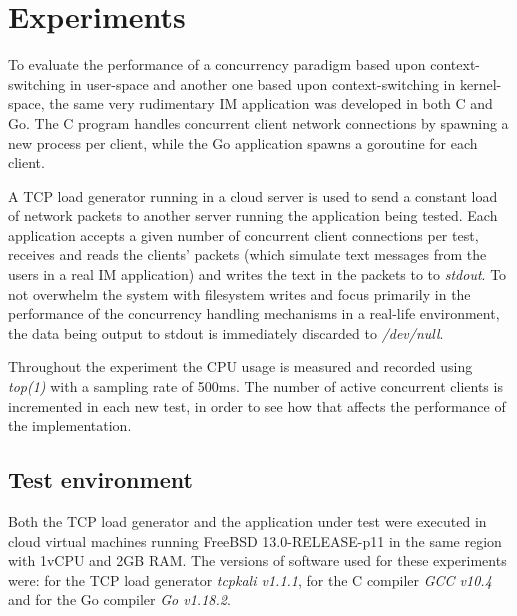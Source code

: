 \section{Experiments}
To evaluate the performance of a concurrency paradigm based upon context-switching in user-space and another one based upon context-switching in kernel-space, the same very rudimentary IM application was developed in both C and Go. The C program handles concurrent client network connections by spawning a new process per client, while the Go application spawns a goroutine for each client. 

A TCP load generator running in a cloud server is used to send a constant load of network packets to another server running the application being tested. Each application accepts a given number of concurrent client connections per test, receives and reads the clients' packets (which simulate text messages from the users in a real IM application) and writes the text in the packets to to \textit{stdout}. To not overwhelm the system with filesystem writes and focus primarily in the performance of the concurrency handling mechanisms in a real-life environment, the data being output to stdout is immediately discarded to \textit{/dev/null}. 

Throughout the experiment the CPU usage is measured and recorded using \textit{top(1)} with a sampling rate of 500ms. The number of active concurrent clients is incremented in each new test, in order to see how that affects the performance of the implementation.

\subsection{Test environment}
Both the TCP load generator and the application under test were executed in cloud virtual machines running FreeBSD 13.0-RELEASE-p11 in the same region with 1vCPU and 2GB RAM. The versions of software used for these experiments were: for the TCP load generator \textit{tcpkali v1.1.1}, for the C compiler \textit{GCC v10.4} and for the Go compiler \textit{Go v1.18.2}.

